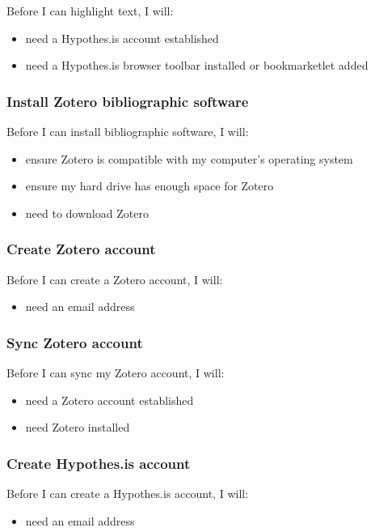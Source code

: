 \documentclass{article}
\begin{document}
Before I can highlight text, I will:
\begin{itemize}
\item need a Hypothes.is account established
\item need a Hypothes.is browser toolbar installed or bookmarketlet added
\end{itemize}

\subsubsection*{Install Zotero bibliographic software}
Before I can install bibliographic software, I will:
\begin{itemize}
\item ensure Zotero is compatible with my computer's operating system
\item ensure my hard drive has enough space for Zotero
\item need to download Zotero
\end{itemize}

\subsubsection*{Create Zotero account}

Before I can create a Zotero account, I will:
\begin{itemize}
\item need an email address
\end{itemize}

\subsubsection*{Sync Zotero account}

Before I can sync my Zotero account, I will:
\begin{itemize}
\item need a Zotero account established
\item need Zotero installed
\end{itemize}

\subsubsection*{Create Hypothes.is account}

Before I can create a Hypothes.is account, I will:
\begin{itemize}
\item need an email address
\end{itemize}
\end{document}
